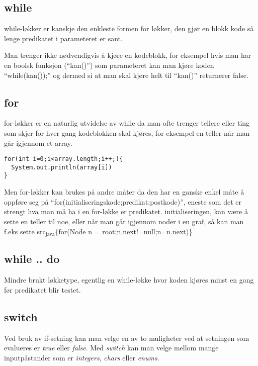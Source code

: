 \documentclass[a4paper,norsk,10pt]{article}
\begin{document}
\subsection{while}
\label{sec-5.1}

   
   while-løkker er kanskje den enkleste formen for løkker, den gjør en blokk kode
   så lenge predikatet i parameteret er sant. 

   Man trenger ikke nødvendigvis å kjøre
   en kodeblokk, for eksempel hvis man har en boolsk funksjon (``kan()'') som parameteret
   kan man kjøre koden ``while(kan());'' og dermed si at man skal kjøre helt til ``kan()''
   returnerer false.
\subsection{for}
\label{sec-5.2}

   
   for-løkker er en naturlig utvidelse av while da man ofte trenger tellere eller ting
   som skjer for hver gang kodeblokken skal kjøres, for eksempel en teller når man går
   igjennom et array.

\begin{verbatim}
for(int i=0;i<array.length;i++;){
  System.out.println(array[i])
}
\end{verbatim}

   Men for-løkker kan brukes på andre måter da den har en ganske enkel måte å oppføre 
   seg på ``for(initialiseringskode;predikat;postkode)'', eneste som det er strengt hva 
   man må ha i en for-løkke er predikatet. initialiseringen, kan være å sette en teller
   til noe, eller når man går igjennom noder i en graf, så kan man f.eks sette 
   src$_{\mathrm{java}}$\{for(Node n = root;n.next!=null;n=n.next)\}
\subsection{while .. do}
\label{sec-5.3}

   
   Mindre brukt løkketype, egentlig en while-løkke hvor koden kjøres minst en gang før
   predikatet blir testet.
  
\subsection{switch}
\label{sec-5.4}


Ved bruk av if-setning kan man velge en av to muligheter ved at
setningen som evalueres er \emph{true} eller \emph{false}. Med \emph{switch} kan man
velge mellom mange inputpåstander som er \emph{integers}, \emph{chars} eller \emph{enums}. 
\end{document}
